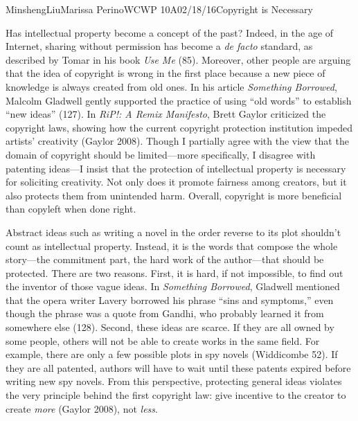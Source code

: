 \documentclass[12pt,letterpaper]{article}
\begin{document}
\begin{mla}{Minsheng}{Liu}{Marissa Perino}{WCWP 10A}{02/18/16}{Copyright is Necessary}

Has intellectual property become a concept of the past? Indeed, in the
age of Internet, sharing without permission has become a \emph{de facto}
standard, as described by Tomar in his book \emph{Use Me} (85).
Moreover, other people are arguing that the idea of copyright is wrong
in the first place because a new piece of knowledge is always created
from old ones. In his article \emph{Something Borrowed}, Malcolm
Gladwell gently supported the practice of using ``old words'' to
establish ``new ideas'' (127). In \emph{RiP!: A Remix Manifesto}, Brett
Gaylor criticized the copyright laws, showing how the current copyright
protection institution impeded artists' creativity (Gaylor 2008). Though
I partially agree with the view that the domain of copyright should be
limited---more specifically, I disagree with patenting ideas---I insist
that the protection of intellectual property is necessary for soliciting
creativity. Not only does it promote fairness among creators, but it
also protects them from unintended harm. Overall, copyright is more
beneficial than copyleft when done right.

Abstract ideas such as writing a novel in the order reverse to its plot
shouldn't count as intellectual property. Instead, it is the words that
compose the whole story---the commitment part, the hard work of the
author---that should be protected. There are two reasons. First, it is
hard, if not impossible, to find out the inventor of those vague ideas.
In \emph{Something Borrowed}, Gladwell mentioned that the opera writer
Lavery borrowed his phrase ``sins and symptoms,'' even though the phrase
was a quote from Gandhi, who probably learned it from somewhere else
(128). Second, these ideas are scarce. If they are all owned by some
people, others will not be able to create works in the same field. For
example, there are only a few possible plots in spy novels (Widdicombe
52). If they are all patented, authors will have to wait until these
patents expired before writing new spy novels. From this perspective,
protecting general ideas violates the very principle behind the first
copyright law: give incentive to the creator to create \emph{more}
(Gaylor 2008), not \emph{less}.


\end{mla}
\end{document}

